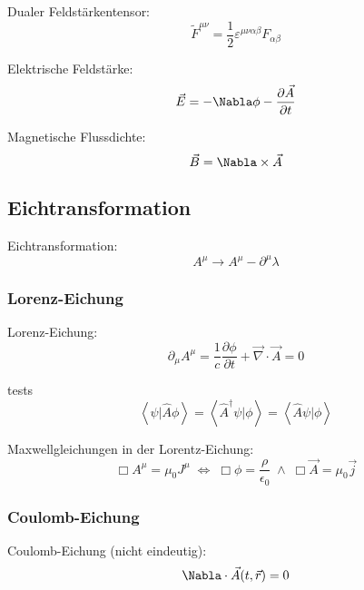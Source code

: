 \documentclass[11pt]{article}
\numberwithin{equation}{section}
\begin{document}
      Dualer Feldstärkentensor:
      \begin{equation}
        \tilde{F}^{\mu\nu} = \frac{1}{2}\varepsilon^{\mu\nu\alpha\beta}F_{\alpha\beta}
      \end{equation}

      Elektrische Feldstärke:
      \begin{equation}
        \vec{E} = -\Nabla\phi-\pder{\vec{A}}{t}
      \end{equation}

      Magnetische Flussdichte:
      \begin{equation}
        \vec{B} = \Nabla\times\vec{A}
      \end{equation}

    \subsection{Eichtransformation}
      Eichtransformation:
      \begin{equation}
        A^\mu \rightarrow A^\mu-\partial^\mu \lambda
      \end{equation}

      \subsubsection{Lorenz-Eichung}
        Lorenz-Eichung:
        \begin{equation}
          \partial_\mu A^\mu = \frac{1}{c}\frac{\partial \phi}{\partial t} + \vec{\nabla}\cdot\vec{A} = 0
        \end{equation}

        tests
        \begin{equation}
          \left<\psi|\hat{A}\phi\right> = \left<\hat{A}^{\dagger}\psi|\phi\right> =
\left<\hat{A}\psi|\phi\right>
        \end{equation}

        Maxwellgleichungen in der Lorentz-Eichung:
        \begin{equation}
          \Box A^\mu = \mu_0 J^\mu \;\Leftrightarrow\;
          \Box \phi = \dfrac{\rho}{\epsilon_0} \;\wedge\;
          \Box \vec{A} = \mu_0 \vec{j}
        \end{equation}

      \subsubsection{Coulomb-Eichung}
        Coulomb-Eichung (nicht eindeutig):
        \begin{equation}
          \Nabla\cdot\vec{A}(t,\vec{r})=0
        \end{equation}
\end{document}
